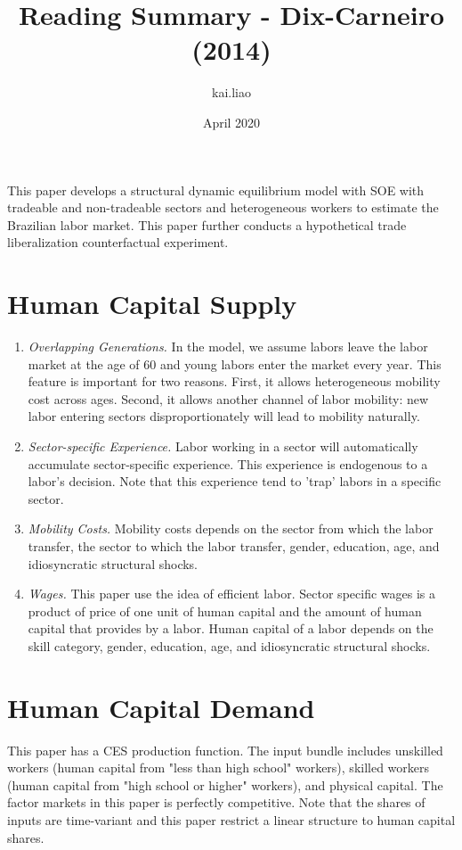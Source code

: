 \documentclass{article}
\title{Reading Summary - Dix-Carneiro (2014)}
\author{kai.liao }
\date{April 2020}
\begin{document}
\maketitle

This paper develops a structural dynamic equilibrium model with SOE with tradeable and non-tradeable sectors and heterogeneous workers to estimate the Brazilian labor market. This paper further conducts a hypothetical trade liberalization counterfactual experiment.

\section{Human Capital Supply}
\begin{enumerate}
    \item \textit{Overlapping Generations. } In the model, we assume labors leave the labor market at the age of 60 and young labors enter the market every year. This feature is important for two reasons. First, it allows heterogeneous mobility cost across ages. Second, it allows another channel of labor mobility: new labor entering sectors disproportionately will lead to mobility naturally. 
    \item \textit{Sector-specific Experience. } Labor working in a sector will automatically accumulate sector-specific experience. This experience is endogenous to a labor's decision. Note that this experience tend to 'trap' labors in a specific sector. 
    \item \textit{Mobility Costs. } Mobility costs depends on the sector from which the labor transfer, the sector to which the labor transfer, gender, education, age, and idiosyncratic structural shocks.
    \item \textit{Wages. } This paper use the idea of efficient labor. Sector specific wages is a product of price of one unit of human capital and the amount of human capital that provides by a labor. Human capital of a labor depends on the skill category, gender, education, age, and idiosyncratic structural shocks. 
\end{enumerate}
\section{Human Capital Demand}
This paper has a CES production function. The input bundle includes unskilled workers (human capital from "less than high school" workers), skilled workers (human capital from "high school or higher" workers), and physical capital. The factor markets in this paper is perfectly competitive. Note that the shares of inputs are time-variant and this paper restrict a linear structure to human capital shares.
\end{document}
